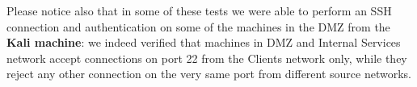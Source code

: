 Please notice also that in some of these tests we were able to perform an SSH connection and authentication on some of the machines in the DMZ from the \textbf{Kali machine}: we indeed verified that machines in DMZ and Internal Services network accept connections on port 22 from the Clients network only, while they reject any other connection on the very same port from different source networks.
